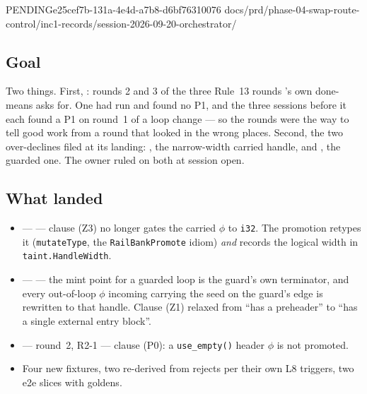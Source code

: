 %
  {PENDING}{e25cef7b-131a-4e4d-a7b8-d6bf76310076}%
  {docs/prd/phase-04-swap-route-control/inc1-records/session-2026-09-20-orchestrator/}

\subsection*{Goal}
Two things. First, : rounds 2 and 3 of the three Rule~13 rounds 's own
done-means asks for. One had run and found no P1, and the three sessions before it each found a P1
on round~1 of a loop change --- so the rounds were the way to tell good work from a round that
looked in the wrong places. Second, the two over-declines  filed at its landing:
, the narrow-width carried handle, and , the guarded one. The owner ruled on
both at session open.

\subsection*{What landed}
\begin{itemize}
  \item {} ---  --- clause (Z3) no longer gates the carried $\phi$ to
        \texttt{i32}. The promotion retypes it (\texttt{mutateType}, the \texttt{RailBankPromote}
        idiom) \emph{and} records the logical width in \texttt{taint.HandleWidth}.
  \item {} ---  --- the mint point for a guarded loop is the guard's own
        terminator, and every out-of-loop $\phi$ incoming carrying the seed on the guard's edge is
        rewritten to that handle. Clause (Z1) relaxed from ``has a preheader'' to ``has a single
        external entry block''.
  \item {} ---  round~2, R2-1 --- clause (P0): a \texttt{use\_empty()}
        header $\phi$ is not promoted.
  \item Four new fixtures, two re-derived from rejects per their own L8 triggers, two e2e slices
        with goldens.
\end{itemize}

